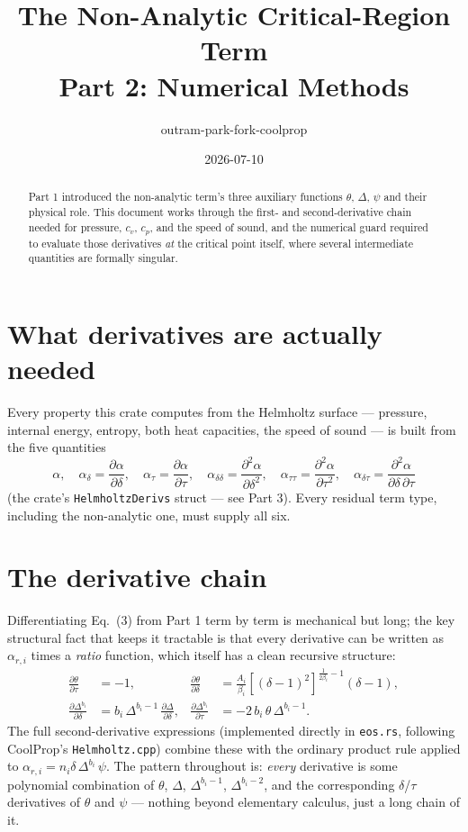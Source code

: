 \documentclass[11pt]{article}
\title{The Non-Analytic Critical-Region Term \\ \large Part 2: Numerical Methods}
\author{outram-park-fork-coolprop}
\date{2026-07-10}
\begin{document}
\maketitle

\begin{abstract}
Part 1 introduced the non-analytic term's three auxiliary functions
$\theta$, $\Delta$, $\psi$ and their physical role. This document works
through the first- and second-derivative chain needed for pressure, $c_v$,
$c_p$, and the speed of sound, and the numerical guard required to evaluate
those derivatives \emph{at} the critical point itself, where several
intermediate quantities are formally singular.
\end{abstract}

\section{What derivatives are actually needed}

Every property this crate computes from the Helmholtz surface — pressure,
internal energy, entropy, both heat capacities, the speed of sound — is
built from the five quantities
\[
  \alpha,\quad
  \alpha_\delta = \frac{\partial \alpha}{\partial \delta},\quad
  \alpha_\tau = \frac{\partial \alpha}{\partial \tau},\quad
  \alpha_{\delta\delta} = \frac{\partial^2 \alpha}{\partial \delta^2},\quad
  \alpha_{\tau\tau} = \frac{\partial^2 \alpha}{\partial \tau^2},\quad
  \alpha_{\delta\tau} = \frac{\partial^2 \alpha}{\partial \delta\, \partial \tau}
\]
(the crate's \texttt{HelmholtzDerivs} struct — see Part 3). Every residual
term type, including the non-analytic one, must supply all six.

\section{The derivative chain}

Differentiating Eq.~(3) from Part 1 term by term is mechanical but long; the
key structural fact that keeps it tractable is that every derivative can be
written as $\alpha_{r,i}$ times a \emph{ratio} function, which itself has a
clean recursive structure:
\begin{align}
  \frac{\partial \theta}{\partial \tau} &= -1, &
  \frac{\partial \theta}{\partial \delta} &= \frac{A_i}{\beta_i}
    \left[(\delta-1)^2\right]^{\frac{1}{2\beta_i}-1}(\delta - 1), \\
  \frac{\partial \Delta^{b_i}}{\partial \delta} &=
    b_i\, \Delta^{b_i - 1}\, \frac{\partial \Delta}{\partial \delta}, &
  \frac{\partial \Delta^{b_i}}{\partial \tau} &=
    -2\, b_i\, \theta\, \Delta^{b_i - 1}.
\end{align}
The full second-derivative expressions (implemented directly in
\texttt{eos.rs}, following CoolProp's \texttt{Helmholtz.cpp}) combine these
with the ordinary product rule applied to
$\alpha_{r,i} = n_i \delta\, \Delta^{b_i}\, \psi$. The pattern throughout is:
\emph{every} derivative is some polynomial combination of $\theta$, $\Delta$,
$\Delta^{b_i-1}$, $\Delta^{b_i-2}$, and the corresponding $\delta$/$\tau$
derivatives of $\theta$ and $\psi$ — nothing beyond elementary calculus, just
a long chain of it.
\end{document}
